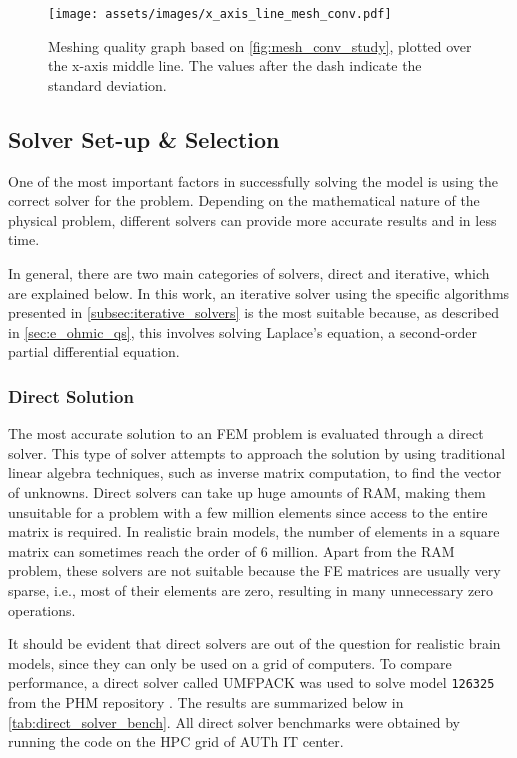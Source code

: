 \begin{figure}[H]
    \centering
    \texttt{[image: assets/images/x\_axis\_line\_mesh\_conv.pdf]}
    \caption{Meshing quality graph based on \autoref{fig:mesh_conv_study}, plotted over the x-axis middle line. The values after the dash indicate the standard deviation.}
    \label{fig:mesh_conv_graph}
\end{figure}

\subsection{Solver Set-up \& Selection}

One of the most important factors in successfully solving the model is using the correct solver for the problem. Depending on the mathematical nature of the physical problem, different solvers can provide more accurate results and in less time.

In general, there are two main categories of solvers, direct and iterative, which are explained below. In this work, an iterative solver using the specific algorithms presented in \ref{subsec:iterative_solvers} is the most suitable because, as described in \ref{sec:e_ohmic_qs}, this involves solving Laplace's equation, a second-order partial differential equation.

\subsubsection{Direct Solution}

The most accurate solution to an \gls{FEM} problem is evaluated through a direct solver. This type of solver attempts to approach the solution by using traditional linear algebra techniques, such as inverse matrix computation, to find the vector of unknowns. Direct solvers can take up huge amounts of \gls{RAM}, making them unsuitable for a problem with a few million elements since access to the entire matrix is required. In realistic brain models, the number of elements in a square matrix can sometimes reach the order of 6 million. Apart from the \gls{RAM} problem, these solvers are not suitable because the \gls{FE} matrices are usually very sparse, i.e., most of their elements are zero, resulting in many unnecessary zero operations.

It should be evident that direct solvers are out of the question for realistic brain models, since they can only be used on a grid of computers. To compare performance, a direct solver called \gls{UMFPACK} \cite{Davis2004_umfpack} was used to solve model \texttt{126325} from the \gls{PHM} repository \cite{ErikG.Lee2016}. The results are summarized below in \autoref{tab:direct_solver_bench}. All direct solver benchmarks were obtained by running the code on the \gls{HPC} grid of \gls{AUTh} \gls{IT} center.

